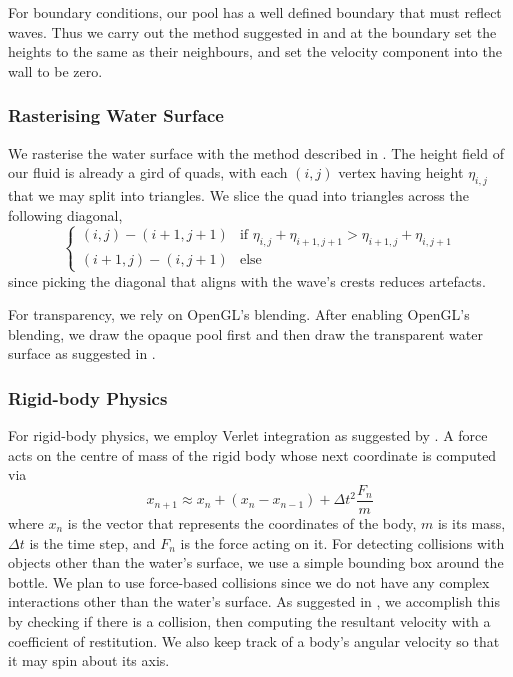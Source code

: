 For boundary conditions, our pool has a well defined boundary that must reflect waves.
Thus we carry out the method suggested in \cite{lec:waves} and at the boundary set the heights to the same as their neighbours, and set the velocity component into the wall to be zero.
\subsubsection{Rasterising Water Surface}
We rasterise the water surface with the method described in \cite{hfluid}.
The height field of our fluid is already a gird of quads, with each $(i,j)$ vertex having height $\eta_{i,j}$ that we may split into triangles.
We slice the quad into triangles across the following diagonal,
$$
\begin{cases}
    (i,j) - (i+1, j+1) & \text{if }\eta_{i,j} + \eta_{i+1,j+1} > \eta_{i+1,j}+\eta_{i,j+1} \\
    (i+1, j) - (i, j+1) & \text{else}
\end{cases}
$$
since picking the diagonal that aligns with the wave's crests reduces artefacts.

For transparency, we rely on OpenGL's blending.
After enabling OpenGL's blending, we draw the opaque pool first and then draw the transparent water surface as suggested in \cite{LearnOpenGL:Ch24}.
\subsubsection{Rigid-body Physics}
For rigid-body physics, we employ Verlet integration as suggested by \cite{lec:particles}.
A force acts on the centre of mass of the rigid body whose next coordinate is computed via 
$$x_{n+1} \approx x_n + (x_n - x_{n-1}) + \Delta t^2 \frac{F_n}m$$
where $x_n$ is the vector that represents the coordinates of the body, $m$ is its mass, $\Delta t$ is the time step, and $F_n$ is the force acting on it.
For detecting collisions with objects other than the water's surface, we use a simple bounding box around the bottle.
We plan to use force-based collisions since we do not have any complex interactions other than the water's surface.
As suggested in \cite{lec:particles}, we accomplish this by checking if there is a collision, then computing the resultant velocity with a coefficient of restitution.
We also keep track of a body's angular velocity so that it may spin about its axis.
